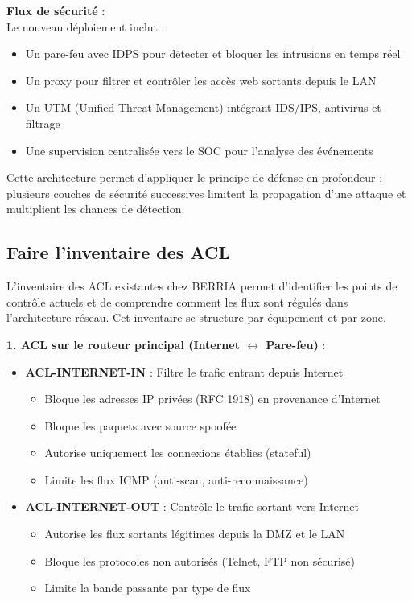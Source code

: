 \noindent \textbf{Flux de sécurité} :\\
Le nouveau déploiement inclut :
\begin{itemize}
  \item Un pare-feu avec IDPS pour détecter et bloquer les intrusions en temps réel
  \item Un proxy pour filtrer et contrôler les accès web sortants depuis le LAN
  \item Un UTM (Unified Threat Management) intégrant IDS/IPS, antivirus et filtrage
  \item Une supervision centralisée vers le SOC pour l'analyse des événements
\end{itemize}

\noindent Cette architecture permet d'appliquer le principe de défense en profondeur : plusieurs couches de sécurité successives limitent la propagation d'une attaque et multiplient les chances de détection.

\subsection*{Faire l'inventaire des ACL}
{}

\noindent L'inventaire des ACL existantes chez BERRIA permet d'identifier les points de contrôle actuels et de comprendre comment les flux sont régulés dans l'architecture réseau. Cet inventaire se structure par équipement et par zone.

\medskip

\noindent \textbf{1. ACL sur le routeur principal (Internet $\leftrightarrow$ Pare-feu)} :\\
\begin{itemize}
  \item \textbf{ACL-INTERNET-IN} : Filtre le trafic entrant depuis Internet
  \begin{itemize}
    \item Bloque les adresses IP privées (RFC 1918) en provenance d'Internet
    \item Bloque les paquets avec source spoofée
    \item Autorise uniquement les connexions établies (stateful)
    \item Limite les flux ICMP (anti-scan, anti-reconnaissance)
  \end{itemize}
  
  \item \textbf{ACL-INTERNET-OUT} : Contrôle le trafic sortant vers Internet
  \begin{itemize}
    \item Autorise les flux sortants légitimes depuis la DMZ et le LAN
    \item Bloque les protocoles non autorisés (Telnet, FTP non sécurisé)
    \item Limite la bande passante par type de flux
  \end{itemize}
\end{itemize}


